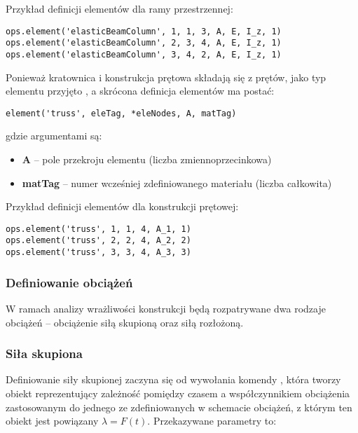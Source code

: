 Przykład definicji elementów dla ramy przestrzennej:

\begin{lstlisting}
ops.element('elasticBeamColumn', 1, 1, 3, A, E, I_z, 1)
ops.element('elasticBeamColumn', 2, 3, 4, A, E, I_z, 1)
ops.element('elasticBeamColumn', 3, 4, 2, A, E, I_z, 1)
\end{lstlisting}

Ponieważ kratownica i konstrukcja prętowa składają się z prętów, jako typ elementu przyjęto , a skrócona definicja elementów ma postać:

\begin{lstlisting}
element('truss', eleTag, *eleNodes, A, matTag)
\end{lstlisting}

gdzie argumentami są:
\begin{itemize}
    \item \textbf{A} – pole przekroju elementu (liczba zmiennoprzecinkowa)
    \item \textbf{matTag} – numer wcześniej zdefiniowanego materiału (liczba całkowita)
\end{itemize}

Przykład definicji elementów dla konstrukcji prętowej:

\begin{lstlisting}
ops.element('truss', 1, 1, 4, A_1, 1)
ops.element('truss', 2, 2, 4, A_2, 2)
ops.element('truss', 3, 3, 4, A_3, 3)
\end{lstlisting}

\subsubsection{Definiowanie obciążeń}

W ramach analizy wrażliwości konstrukcji będą rozpatrywane dwa rodzaje obciążeń – obciążenie siłą skupioną oraz siłą rozłożoną.

\subsubsection*{Siła skupiona}

Definiowanie siły skupionej zaczyna się od wywołania komendy , która
tworzy obiekt reprezentujący zależność pomiędzy czasem a współczynnikiem obciążenia zastosowanym do jednego ze zdefiniowanych
w schemacie obciążeń, z którym ten obiekt jest powiązany $\lambda=F(t)$.
Przekazywane parametry to:

